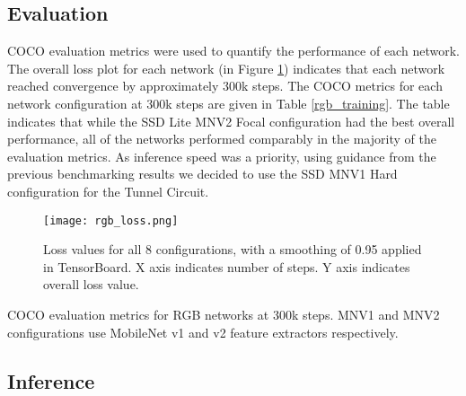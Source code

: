 \subsection{Evaluation}

COCO evaluation metrics were used to quantify the performance of each network. The overall loss plot for each network (in Figure \ref{rgb_loss}) indicates that each network reached convergence by approximately 300k steps. The COCO metrics for each network configuration at 300k steps are given in Table \ref{rgb_training}. The table indicates that while the SSD Lite MNV2 Focal configuration had the best overall performance, all of the networks performed comparably in the majority of the evaluation metrics. As inference speed was a priority, using guidance from the previous benchmarking results we decided to use the SSD MNV1 Hard configuration for the Tunnel Circuit.

\begin{figure}	
	\centering
	\texttt{[image: rgb\_loss.png]}
	\caption[RGB network loss values]{Loss values for all 8 configurations, with a smoothing of 0.95 applied in TensorBoard. X axis indicates number of steps. Y axis indicates overall loss value.}
	\label{rgb_loss}
\end{figure}

\begin{table}
	\centering
	\begin{adjustbox}{max width=.95\textwidth}
	\end{adjustbox}
	\caption[COCO evaluation metrics for RGB networks at 300k steps]{COCO evaluation metrics for RGB networks at 300k steps. MNV1 and MNV2 configurations use MobileNet v1 and v2 feature extractors respectively.}
	\label{rgb_training}
\end{table}

\subsection{Inference}

